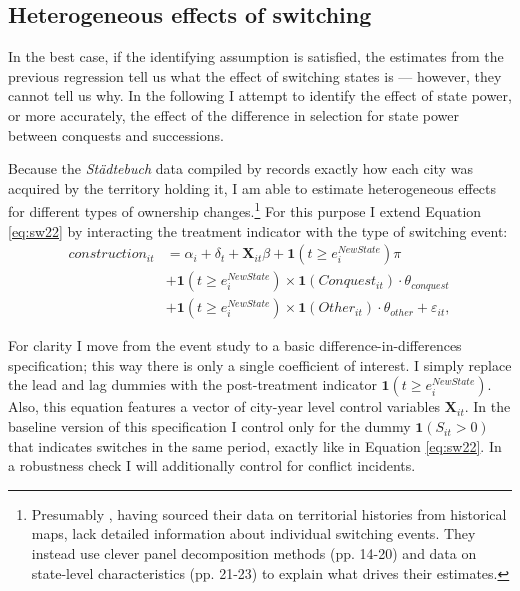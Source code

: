 \documentclass[11pt, a4paper]{article}
\begin{document}
\subsection{Heterogeneous effects of switching}

In the best case, if the identifying assumption is satisfied, the estimates from the previous regression tell us what the effect of switching states is --- however, they cannot tell us why. In the following I attempt to identify the effect of state power, or more accurately, the effect of the difference in selection for state power between conquests and successions. 

Because the \textit{Städtebuch} data compiled by \cite{pt2} records exactly how each city was acquired by the territory holding it, I am able to estimate heterogeneous effects for different types of ownership changes.\footnote
{
Presumably \cite{schoenholzer2022}, having sourced their data on territorial histories from historical maps, lack detailed information about individual switching events. They instead use clever panel decomposition methods (pp. 14-20) and data on state-level characteristics (pp. 21-23) to explain what drives their estimates.
}
For this purpose I extend Equation \eqref{eq:sw22} by interacting the treatment indicator with the type of switching event:
\begin{equation}
\label{eq:baseline}
\begin{split}
    construction_{it} &= \alpha_i + \delta_t + \mathbf{X}_{it} \beta + 
    \mathbf{1}(t \ge e^{NewState}_i) \pi \\
    &+ \mathbf{1}(t \ge e^{NewState}_i) \times
    \mathbf{1}(Conquest_{it}) \cdot \theta_{conquest} \\
    &+ \mathbf{1}(t \ge e^{NewState}_i) \times
    \mathbf{1}(Other_{it}) \cdot \theta_{other} + \varepsilon_{it},
\end{split}
\end{equation}

For clarity I move from the event study to a basic difference-in-differences specification; this way there is only a single coefficient of interest. I simply replace the lead and lag dummies with the post-treatment indicator $\mathbf{1}(t \ge e^{NewState}_i)$. Also, this equation features a vector of city-year level control variables $\mathbf{X}_{it}$. In the baseline version of this specification I control only for the dummy $\mathbf{1}(S_{it} > 0)$ that indicates switches in the same period, exactly like in Equation \eqref{eq:sw22}. In a robustness check I will additionally control for conflict incidents.
\end{document}

